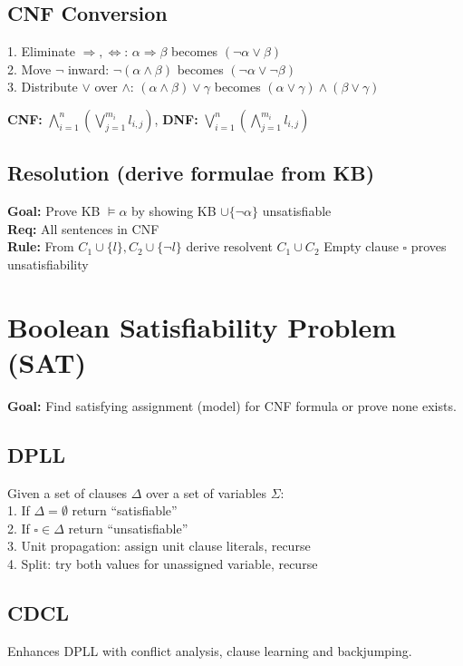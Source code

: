 \documentclass[8pt,landscape,a4paper]{article}
\begin{document}
\begin{multicols*}{3}
\subsection{CNF Conversion}
1. Eliminate $\Rightarrow, \Leftrightarrow$: $\alpha \Rightarrow \beta$ becomes $(\neg\alpha \vee \beta)$\\
2. Move $\neg$ inward: $\neg(\alpha \wedge \beta)$ becomes $(\neg\alpha \vee \neg\beta)$  \\
3. Distribute $\vee$ over $\wedge$: $(\alpha\wedge\beta)\vee\gamma$ becomes $(\alpha\vee\gamma)\wedge(\beta\vee\gamma)$

\textbf{CNF:} $\bigwedge_{i=1}^n\left(\bigvee_{j=1}^{m_i} l_{i,j}\right)$, \textbf{DNF:} $\bigvee_{i=1}^n\left(\bigwedge_{j=1}^{m_i} l_{i,j}\right)$

\subsection{Resolution (derive formulae from KB)}
\textbf{Goal:} Prove KB $\models \alpha$ by showing KB $\cup \{\neg\alpha\}$ unsatisfiable\\
\textbf{Req:} All sentences in CNF\\
\textbf{Rule:} From $C_1 \cup \{l\}, C_2 \cup \{\neg l\}$ derive resolvent $C_1 \cup C_2$
Empty clause $\square$ proves unsatisfiability

\section{Boolean Satisfiability Problem (SAT)}
\textbf{Goal:} Find satisfying assignment (model) for CNF formula or prove none exists.

\subsection{DPLL}
Given a set of clauses $\Delta$ over a set of variables $\Sigma$:\\
1. If $\Delta = \emptyset$ return ``satisfiable''\\
2. If $\square \in \Delta$ return ``unsatisfiable''\\  
3. Unit propagation: assign unit clause literals, recurse\\
4. Split: try both values for unassigned variable, recurse

\subsection{CDCL}
Enhances DPLL with conflict analysis, clause learning and backjumping.


\end{multicols*}
\end{document}
